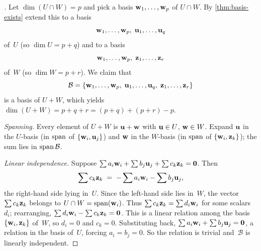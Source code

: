 \begin{proof}[]
Let $\dim(U \cap W) = p$ and pick a basis
$\mathbf{w}_1, \dots, \mathbf{w}_p$ of $U \cap W$. By
\cref{thm:basis-exists} extend this to a basis
\[
  \mathbf{w}_1, \dots, \mathbf{w}_p,\; \mathbf{u}_1, \dots, \mathbf{u}_q
\]
of~$U$ (so $\dim U = p + q$) and to a basis
\[
  \mathbf{w}_1, \dots, \mathbf{w}_p,\; \mathbf{z}_1, \dots, \mathbf{z}_r
\]
of~$W$ (so $\dim W = p + r$). We claim that
\[
  \mathcal{B} = \{\mathbf{w}_1, \dots, \mathbf{w}_p,\; \mathbf{u}_1, \dots, \mathbf{u}_q,\;
                  \mathbf{z}_1, \dots, \mathbf{z}_r\}
\]
is a basis of $U + W$, which yields $\dim(U + W) = p + q + r =
(p + q) + (p + r) - p$.

\emph{Spanning.} Every element of $U + W$ is $\mathbf{u} + \mathbf{w}$
with $\mathbf{u} \in U$, $\mathbf{w} \in W$. Expand $\mathbf{u}$ in the
$U$-basis (in $\operatorname{span}$ of $\{\mathbf{w}_i, \mathbf{u}_j\}$) and $\mathbf{w}$ in
the $W$-basis (in $\operatorname{span}$ of $\{\mathbf{w}_i, \mathbf{z}_k\}$); the sum lies
in $\operatorname{span} \mathcal{B}$.

\emph{Linear independence.} Suppose
$\sum a_i \mathbf{w}_i + \sum b_j \mathbf{u}_j + \sum c_k \mathbf{z}_k = \mathbf{0}$.
Then
\[
  \sum c_k \mathbf{z}_k \;=\; -\sum a_i \mathbf{w}_i - \sum b_j \mathbf{u}_j,
\]
the right-hand side lying in~$U$. Since the left-hand side lies
in~$W$, the vector $\sum c_k \mathbf{z}_k$ belongs to $U \cap W = \operatorname{span}(\mathbf{w}_i)$.
Thus $\sum c_k \mathbf{z}_k = \sum d_i \mathbf{w}_i$ for some scalars $d_i$;
rearranging, $\sum d_i \mathbf{w}_i - \sum c_k \mathbf{z}_k = \mathbf{0}$.
This is a linear relation among the basis $\{\mathbf{w}_i, \mathbf{z}_k\}$
of~$W$, so $d_i = 0$ and $c_k = 0$. Substituting back,
$\sum a_i \mathbf{w}_i + \sum b_j \mathbf{u}_j = \mathbf{0}$, a relation in
the basis of~$U$, forcing $a_i = b_j = 0$. So the relation is trivial
and~$\mathcal{B}$ is linearly independent.
\end{proof}

